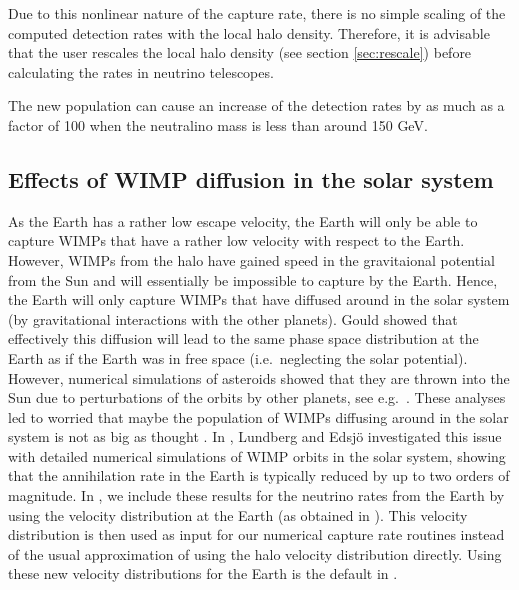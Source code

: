 Due to this nonlinear nature of the capture rate, there is no simple
scaling of the computed detection rates with the local halo density.
Therefore, it is advisable that the user rescales the local halo
density (see section \ref{sec:rescale}) before calculating the rates
in neutrino telescopes.

The new population can cause an increase of the detection rates
by as much as a factor of 100 when the neutralino mass is less
than around 150 GeV\@.


\subsection{Effects of WIMP diffusion in the solar system}

As the Earth has a rather low escape velocity, the Earth will only be
able to capture WIMPs that have a rather low velocity with respect to
the Earth. However, WIMPs from the halo have gained speed in the
gravitaional potential from the Sun and will essentially be impossible
to capture by the Earth. Hence, the Earth will only capture WIMPs that
have diffused around in the solar system (by gravitational
interactions with the other planets). Gould showed \cite{gould-diff}
that effectively this diffusion will lead to the same phase space
distribution at the Earth as if the Earth was in free space
(i.e.\ neglecting the solar potential). However, numerical simulations
of asteroids showed that they are thrown into the Sun due to
perturbations of the orbits by other planets, see
e.g.\ \cite{farinella}. These analyses led to worried that maybe the
population of WIMPs diffusing around in the solar system is not as big
as thought \cite{gould-conserv}. In \cite{earth-diff}, Lundberg and
Edsj\"o investigated this issue with detailed numerical simulations of
WIMP orbits in the solar system, showing that the annihilation rate in
the Earth is typically reduced by up to two orders of magnitude. In
\ds, we include these results for the neutrino rates from the Earth by
using the velocity distribution at the Earth (as obtained in
\cite{earth-diff}). This velocity distribution is then used as input
for our numerical capture rate routines instead of the usual
approximation of using the halo velocity distribution directly. Using
these new velocity distributions for the Earth is the default in \ds.
